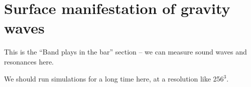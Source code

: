 \section{Surface manifestation of gravity waves}
\label{sec:results_surface}

This is the ``Band plays in the bar'' section -- we can measure sound waves and resonances here.

We should run simulations for a long time here, at a resolution like 256$^3$.




